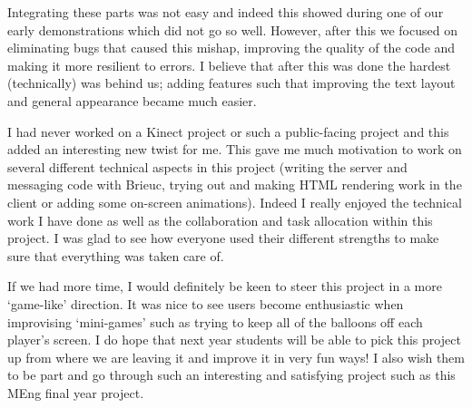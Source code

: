 Integrating these parts was not easy and indeed this showed during one of our
early demonstrations which did not go so well. However, after this we focused
on eliminating bugs that caused this mishap, improving the quality of the code and making
it more resilient to errors. I believe that after this was done the hardest
(technically) was behind us; adding features such that improving the text layout
and general appearance became much easier. 

I had never worked on a Kinect project or such a public-facing project and this
added an interesting new twist for me. This gave me much motivation to work on
several different technical aspects in this project (writing the server and
messaging code with Brieuc, trying out and making HTML rendering work in the 
client or adding some on-screen animations). Indeed I really enjoyed the technical
work I have done as well as the collaboration and task allocation within this 
project. I was glad to see how everyone used their different strengths to make
sure that everything was taken care of. 

If we had more time, I would definitely be keen to steer this project in a more
`game-like' direction. It was nice to see users become enthusiastic when 
improvising `mini-games' such as trying to keep all of the balloons off each
player's screen. I do hope that next year students will be able to pick this 
project up from where we are leaving it and improve it in very fun ways! I also
wish them to be part and go through such an interesting and satisfying project
such as this MEng final year project.
